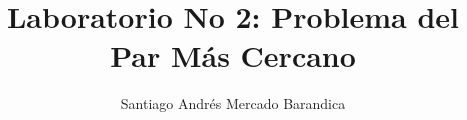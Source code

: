 \documentclass[journal,onecolumn]{IEEEtran}	%
\begin{document}
\title{Laboratorio No 2: Problema del Par Más Cercano}%
\author{Santiago Andrés Mercado Barandica}%
\maketitle				%









\end{document}
